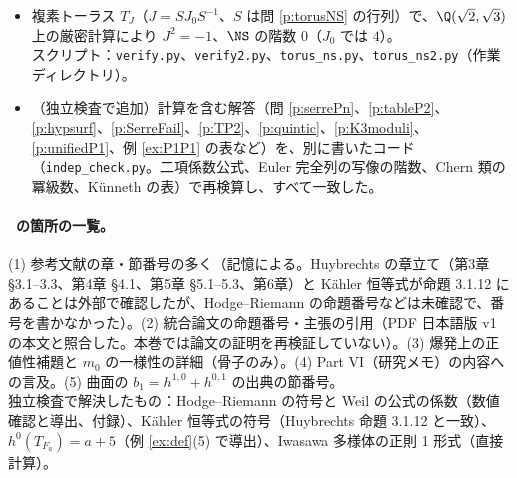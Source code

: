 \begin{itemize}
\item 複素トーラス $T_J$（$J=SJ_0S^{-1}$、$S$ は問 \ref{p:torusNS} の行列）で、$\Q(\sqrt2,\sqrt3)$ 上の厳密計算により $J^2=-1$、$\NS$ の階数 $0$（$J_0$ では $4$）。\\ スクリプト：\texttt{verify.py}、\texttt{verify2.py}、\texttt{torus\_ns.py}、\texttt{torus\_ns2.py}（作業ディレクトリ）。
\item （独立検査で追加）計算を含む解答（問 \ref{p:serrePn}、\ref{p:tableP2}、\ref{p:hypsurf}、\ref{p:SerreFail}、\ref{p:TP2}、\ref{p:quintic}、\ref{p:K3moduli}、\ref{p:unifiedP1}、例 \ref{ex:P1P1} の表など）を、別に書いたコード（\texttt{indep\_check.py}。二項係数公式、Euler 完全列の写像の階数、Chern 類の冪級数、Künneth の表）で再検算し、すべて一致した。
\end{itemize}
\paragraph{\tQ\ の箇所の一覧。}(1) 参考文献の章・節番号の多く（記憶による。Huybrechts の章立て（第3章 \S3.1--3.3、第4章 \S4.1、第5章 \S5.1--5.3、第6章）と Kähler 恒等式が命題 3.1.12 にあることは外部で確認したが、Hodge--Riemann の命題番号などは未確認で、番号を書かなかった）。(2) 統合論文の命題番号・主張の引用（PDF 日本語版 v1 の本文と照合した。本巻では論文の証明を再検証していない）。(3) 爆発上の正値性補題と $m_0$ の一様性の詳細（骨子のみ）。(4) Part VI（研究メモ）の内容への言及。(5) 曲面の $b_1=h^{1,0}+h^{0,1}$ の出典の節番号。\\ 独立検査で解決したもの：Hodge--Riemann の符号と Weil の公式の係数（数値確認と導出、付録）、Kähler 恒等式の符号（Huybrechts 命題 3.1.12 と一致）、$h^0(T_{F_a})=a+5$（例 \ref{ex:def}(5) で導出）、Iwasawa 多様体の正則 1 形式（直接計算）。

